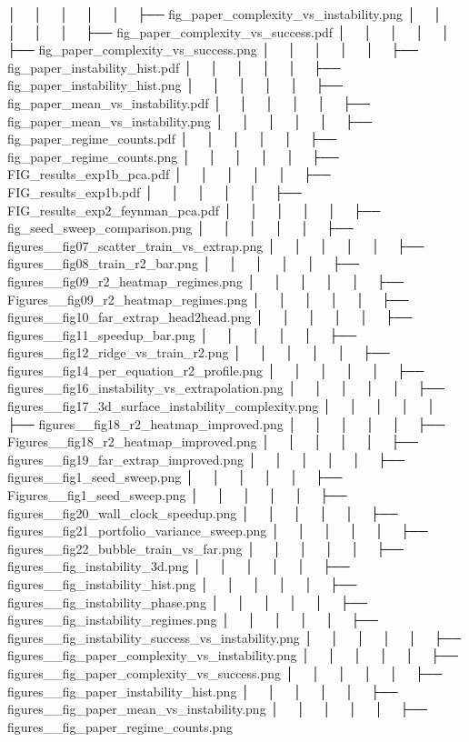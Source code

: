 │   │       │   │   │   ├── fig_paper_complexity_vs_instability.png
│   │       │   │   │   ├── fig_paper_complexity_vs_success.pdf
│   │       │   │   │   ├── fig_paper_complexity_vs_success.png
│   │       │   │   │   ├── fig_paper_instability_hist.pdf
│   │       │   │   │   ├── fig_paper_instability_hist.png
│   │       │   │   │   ├── fig_paper_mean_vs_instability.pdf
│   │       │   │   │   ├── fig_paper_mean_vs_instability.png
│   │       │   │   │   ├── fig_paper_regime_counts.pdf
│   │       │   │   │   ├── fig_paper_regime_counts.png
│   │       │   │   │   ├── FIG_results_exp1b_pca.pdf
│   │       │   │   │   ├── FIG_results_exp1b.pdf
│   │       │   │   │   ├── FIG_results_exp2_feynman_pca.pdf
│   │       │   │   │   ├── fig_seed_sweep_comparison.png
│   │       │   │   │   ├── figures__fig07_scatter_train_vs_extrap.png
│   │       │   │   │   ├── figures__fig08_train_r2_bar.png
│   │       │   │   │   ├── figures__fig09_r2_heatmap_regimes.png
│   │       │   │   │   ├── Figures__fig09_r2_heatmap_regimes.png
│   │       │   │   │   ├── figures__fig10_far_extrap_head2head.png
│   │       │   │   │   ├── figures__fig11_speedup_bar.png
│   │       │   │   │   ├── figures__fig12_ridge_vs_train_r2.png
│   │       │   │   │   ├── figures__fig14_per_equation_r2_profile.png
│   │       │   │   │   ├── figures__fig16_instability_vs_extrapolation.png
│   │       │   │   │   ├── figures__fig17_3d_surface_instability_complexity.png
│   │       │   │   │   ├── figures__fig18_r2_heatmap_improved.png
│   │       │   │   │   ├── Figures__fig18_r2_heatmap_improved.png
│   │       │   │   │   ├── figures__fig19_far_extrap_improved.png
│   │       │   │   │   ├── figures__fig1_seed_sweep.png
│   │       │   │   │   ├── Figures__fig1_seed_sweep.png
│   │       │   │   │   ├── figures__fig20_wall_clock_speedup.png
│   │       │   │   │   ├── figures__fig21_portfolio_variance_sweep.png
│   │       │   │   │   ├── figures__fig22_bubble_train_vs_far.png
│   │       │   │   │   ├── figures__fig_instability_3d.png
│   │       │   │   │   ├── figures__fig_instability_hist.png
│   │       │   │   │   ├── figures__fig_instability_phase.png
│   │       │   │   │   ├── figures__fig_instability_regimes.png
│   │       │   │   │   ├── figures__fig_instability_success_vs_instability.png
│   │       │   │   │   ├── figures__fig_paper_complexity_vs_instability.png
│   │       │   │   │   ├── figures__fig_paper_complexity_vs_success.png
│   │       │   │   │   ├── figures__fig_paper_instability_hist.png
│   │       │   │   │   ├── figures__fig_paper_mean_vs_instability.png
│   │       │   │   │   ├── figures__fig_paper_regime_counts.png
